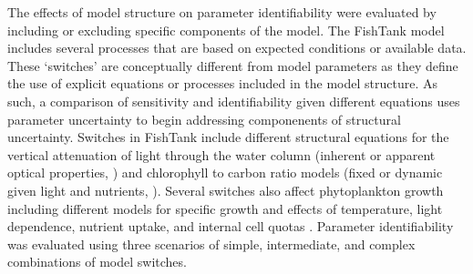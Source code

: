 \documentclass[letterpaper,12pt,oneside]{article}\usepackage[]{graphicx}\usepackage[]{color}
\begin{document}
The effects of model structure on parameter identifiability were evaluated by including or excluding specific components of the model.  The FishTank model includes several processes that are based on expected conditions or available data.  These `switches' are conceptually different from model parameters as they define the use of explicit equations or processes included in the model structure.  As such, a comparison of sensitivity and identifiability given different equations uses parameter uncertainty to begin addressing componenents of structural uncertainty.  Switches in FishTank include different structural equations for the vertical attenuation of light through the water column (inherent or apparent optical properties, \citealt{Penta09,Eldridge10}) and chlorophyll to carbon ratio models (fixed or dynamic given light and nutrients, \citealt{Cloern95}).  Several switches also affect phytoplankton growth including different models for specific growth and effects of temperature, light dependence, nutrient uptake, and internal cell quotas .  Parameter identifiability was evaluated using three scenarios of simple, intermediate, and complex combinations of model switches.  
\end{document}
